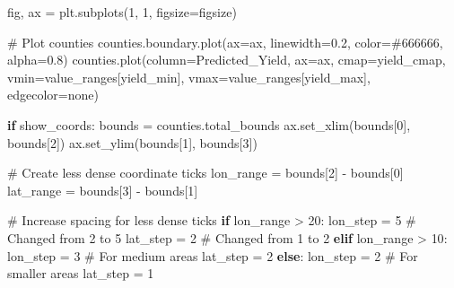 \documentclass[
  letterpaper,
  DIV=11,
  numbers=noendperiod]{scrreprt}
\newenvironment{Shaded}{\begin{snugshade}}{\end{snugshade}}
\newcommand{\CommentTok}[1]{\textcolor[rgb]{0.37,0.37,0.37}{#1}}
\newcommand{\ControlFlowTok}[1]{\textcolor[rgb]{0.00,0.23,0.31}{\textbf{#1}}}
\newcommand{\DecValTok}[1]{\textcolor[rgb]{0.68,0.00,0.00}{#1}}
\newcommand{\FloatTok}[1]{\textcolor[rgb]{0.68,0.00,0.00}{#1}}
\newcommand{\NormalTok}[1]{\textcolor[rgb]{0.00,0.23,0.31}{#1}}
\newcommand{\OperatorTok}[1]{\textcolor[rgb]{0.37,0.37,0.37}{#1}}
\newcommand{\StringTok}[1]{\textcolor[rgb]{0.13,0.47,0.30}{#1}}
\begin{document}
\begin{Shaded}
\begin{Highlighting}[]
\NormalTok{    fig, ax }\OperatorTok{=}\NormalTok{ plt.subplots(}\DecValTok{1}\NormalTok{, }\DecValTok{1}\NormalTok{, figsize}\OperatorTok{=}\NormalTok{figsize)}

    \CommentTok{\# Plot counties}
\NormalTok{    counties.boundary.plot(ax}\OperatorTok{=}\NormalTok{ax, linewidth}\OperatorTok{=}\FloatTok{0.2}\NormalTok{, color}\OperatorTok{=}\StringTok{\textquotesingle{}\#666666\textquotesingle{}}\NormalTok{, alpha}\OperatorTok{=}\FloatTok{0.8}\NormalTok{)}
\NormalTok{    counties.plot(column}\OperatorTok{=}\StringTok{\textquotesingle{}Predicted\_Yield\textquotesingle{}}\NormalTok{,}
\NormalTok{                 ax}\OperatorTok{=}\NormalTok{ax,}
\NormalTok{                 cmap}\OperatorTok{=}\NormalTok{yield\_cmap,}
\NormalTok{                 vmin}\OperatorTok{=}\NormalTok{value\_ranges[}\StringTok{\textquotesingle{}yield\_min\textquotesingle{}}\NormalTok{],}
\NormalTok{                 vmax}\OperatorTok{=}\NormalTok{value\_ranges[}\StringTok{\textquotesingle{}yield\_max\textquotesingle{}}\NormalTok{],}
\NormalTok{                 edgecolor}\OperatorTok{=}\StringTok{\textquotesingle{}none\textquotesingle{}}\NormalTok{)}

    \ControlFlowTok{if}\NormalTok{ show\_coords:}
\NormalTok{        bounds }\OperatorTok{=}\NormalTok{ counties.total\_bounds}
\NormalTok{        ax.set\_xlim(bounds[}\DecValTok{0}\NormalTok{], bounds[}\DecValTok{2}\NormalTok{])}
\NormalTok{        ax.set\_ylim(bounds[}\DecValTok{1}\NormalTok{], bounds[}\DecValTok{3}\NormalTok{])}

        \CommentTok{\# Create less dense coordinate ticks}
\NormalTok{        lon\_range }\OperatorTok{=}\NormalTok{ bounds[}\DecValTok{2}\NormalTok{] }\OperatorTok{{-}}\NormalTok{ bounds[}\DecValTok{0}\NormalTok{]}
\NormalTok{        lat\_range }\OperatorTok{=}\NormalTok{ bounds[}\DecValTok{3}\NormalTok{] }\OperatorTok{{-}}\NormalTok{ bounds[}\DecValTok{1}\NormalTok{]}

        \CommentTok{\# Increase spacing for less dense ticks}
        \ControlFlowTok{if}\NormalTok{ lon\_range }\OperatorTok{\textgreater{}} \DecValTok{20}\NormalTok{:}
\NormalTok{            lon\_step }\OperatorTok{=} \DecValTok{5}    \CommentTok{\# Changed from 2 to 5}
\NormalTok{            lat\_step }\OperatorTok{=} \DecValTok{2}    \CommentTok{\# Changed from 1 to 2}
        \ControlFlowTok{elif}\NormalTok{ lon\_range }\OperatorTok{\textgreater{}} \DecValTok{10}\NormalTok{:}
\NormalTok{            lon\_step }\OperatorTok{=} \DecValTok{3}    \CommentTok{\# For medium areas}
\NormalTok{            lat\_step }\OperatorTok{=} \DecValTok{2}
        \ControlFlowTok{else}\NormalTok{:}
\NormalTok{            lon\_step }\OperatorTok{=} \DecValTok{2}    \CommentTok{\# For smaller areas}
\NormalTok{            lat\_step }\OperatorTok{=} \DecValTok{1}


\end{Highlighting}
\end{Shaded}
\end{document}

